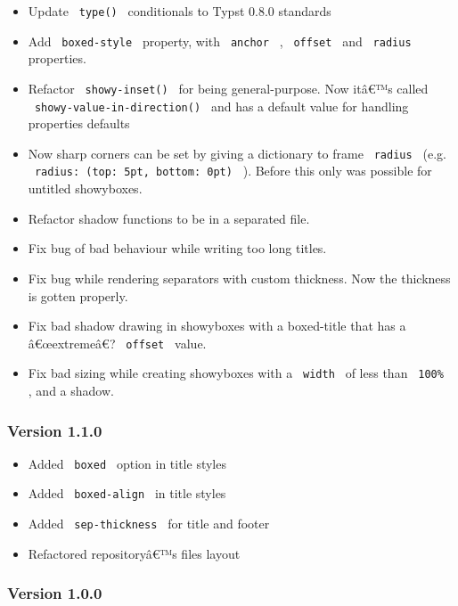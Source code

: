 \begin{itemize}
\tightlist
\item
  Update \texttt{\ type()\ } conditionals to Typst 0.8.0 standards
\item
  Add \texttt{\ boxed-style\ } property, with \texttt{\ anchor\ } ,
  \texttt{\ offset\ } and \texttt{\ radius\ } properties.
\item
  Refactor \texttt{\ showy-inset()\ } for being general-purpose. Now
  itâ€™s called \texttt{\ showy-value-in-direction()\ } and has a
  default value for handling properties defaults
\item
  Now sharp corners can be set by giving a dictionary to frame
  \texttt{\ radius\ } (e.g.
  \texttt{\ radius:\ (top:\ 5pt,\ bottom:\ 0pt)\ } ). Before this only
  was possible for untitled showyboxes.
\item
  Refactor shadow functions to be in a separated file.
\item
  Fix bug of bad behaviour while writing too long titles.
\item
  Fix bug while rendering separators with custom thickness. Now the
  thickness is gotten properly.
\item
  Fix bad shadow drawing in showyboxes with a boxed-title that has a
  â€œextremeâ€? \texttt{\ offset\ } value.
\item
  Fix bad sizing while creating showyboxes with a \texttt{\ width\ } of
  less than \texttt{\ 100\%\ } , and a shadow.
\end{itemize}

\subsubsection{Version 1.1.0}\label{version-1.1.0}

\begin{itemize}
\tightlist
\item
  Added \texttt{\ boxed\ } option in title styles
\item
  Added \texttt{\ boxed-align\ } in title styles
\item
  Added \texttt{\ sep-thickness\ } for title and footer
\item
  Refactored repositoryâ€™s files layout
\end{itemize}

\subsubsection{Version 1.0.0}\label{version-1.0.0}


